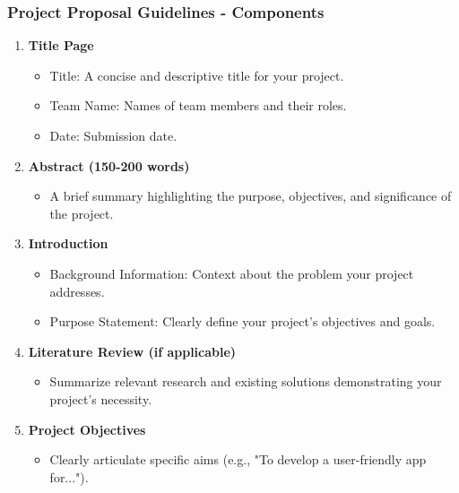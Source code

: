 \documentclass[aspectratio=169]{beamer}
\begin{document}
\begin{frame}[fragile]
  \frametitle{Project Proposal Guidelines - Components}
  \begin{enumerate}
    \item \textbf{Title Page}
      \begin{itemize}
        \item Title: A concise and descriptive title for your project.
        \item Team Name: Names of team members and their roles.
        \item Date: Submission date.
      \end{itemize}

    \item \textbf{Abstract (150-200 words)}
      \begin{itemize}
        \item A brief summary highlighting the purpose, objectives, and significance of the project.
      \end{itemize}

    \item \textbf{Introduction}
      \begin{itemize}
        \item Background Information: Context about the problem your project addresses.
        \item Purpose Statement: Clearly define your project's objectives and goals.
      \end{itemize}

    \item \textbf{Literature Review (if applicable)}
      \begin{itemize}
        \item Summarize relevant research and existing solutions demonstrating your project's necessity.
      \end{itemize}

    \item \textbf{Project Objectives}
      \begin{itemize}
        \item Clearly articulate specific aims (e.g., "To develop a user-friendly app for...").
      \end{itemize}
  \end{enumerate}
\end{frame}
\end{document}
